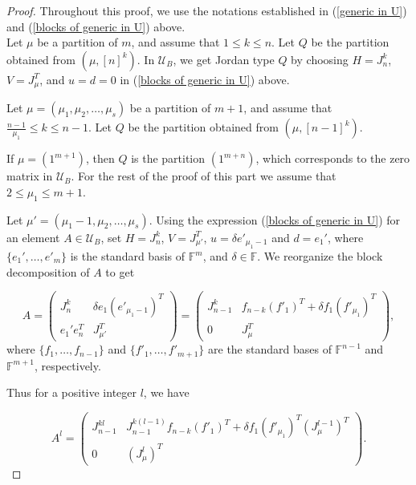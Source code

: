 \documentclass[10pt,a4paper]{amsart}
\newcommand{\U}{\mathcal{U}}
\begin{document}
\begin{proof}
Throughout this proof, we use the notations established in (\ref{generic in U}) and  (\ref{blocks of generic in U}) above.
\\

  Let $\mu$ be a partition of $m$, and assume that $1\leq k\leq n$. Let $Q$ be the partition obtained from $\left(\mu, [n]^k\right)$. In $\U_B$, we get Jordan type $Q$ by choosing $H=J_n^k$, $V=J_\mu^T$, and $u=d=0$ in (\ref{blocks of generic in U}) above.

 Let $\mu=(\mu_1, \mu_2, \ldots, \mu_s)$ be a partition of $m+1$, and assume that $\frac{n-1}{\mu_1}\leq k\leq n-1$. Let $Q$ be the partition obtained from $\left(\mu, [n-1]^k\right)$.

If $\mu=\left(1^{m+1}\right)$, then $Q$ is the partition $\left(1^{m+n}\right)$, which corresponds to the zero matrix in $\U_B$.  For the rest of the proof of this part we assume that $2\leq \mu_1\leq m+1$.

Let $\mu'=(\mu_1-1,\mu_2, \ldots, \mu_s)$. Using the expression (\ref{blocks of generic in U}) for an element $A\in \U_B$, set $H=J_n^k$, $V=J_{\mu'}^T$, $u=\delta e'_{\mu_1-1}$ and $d=e_1'$, where $\{e_1', \ldots, e'_m\}$ is the standard basis of $\mathbb{F}^m$, and $\delta\in \mathbb{F}$. We reorganize the block decomposition of $A$ to get

\[A=\left( 
\begin{array}{c|c}
  J_n^k  & \delta e_1\left(e'_{\mu_1-1}\right)^T \\
  \hline
  e_1'e_n^T   & J_{\mu'}^T
\end{array}
\right)= 
\left( 
\begin{array}{c|c}
  J_{n-1}^k & f_{n-k}\left(f'_1\right)^T +\delta f_1\left(f'_{\mu_1}\right)^T\\
 \hline
  0 & J_\mu^T
\end{array}
\right),\]
%
where $\{f_1, \ldots, f_{n-1}\}$ and $\{f'_1, \ldots, f'_{m+1}\}$ are the standard bases of $\mathbb{F}^{n-1}$ and $\mathbb{F}^{m+1}$, respectively. 

Thus for a positive integer $l$, we have 

\[A^l=\left(
\begin{array}{c|c}
    J_{n-1}^{kl} & J_{n-1}^{k(l-1)}f_{n-k}(f'_1)^T+\delta f_1\left(f'_{\mu_1}\right)^T (J_\mu^{l-1})^{T}\\
    \hline
    0 & \left(J^l_{\mu }\right)^T
\end{array}
\right).
\]


\end{proof}
\end{document}
